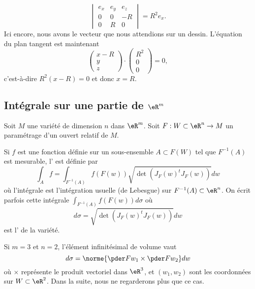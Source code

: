 \begin{example}
\begin{equation}
\begin{vmatrix}
			e_x & e_y & e_z \\
			0   & 0   & -R  \\
			0   & R   & 0
		\end{vmatrix}=R^2e_x.
	\end{equation}
	Ici encore, nous avons le vecteur que nous attendions sur un dessin. L'équation du plan tangent est maintenant
	\begin{equation}
		\begin{pmatrix}
			x-R \\
			y   \\
			z
		\end{pmatrix}\cdot
		\begin{pmatrix}
			R^2 \\
			0   \\
			0
		\end{pmatrix}=0,
	\end{equation}
	c'est-à-dire \( R^2(x-R)=0\) et donc \( x=R\).
\end{example}

\subsection{Intégrale sur une partie de \( \eR^m\)}

Soit \( M\) une variété de dimension \( n\) dans \( \eR^m\). Soit \( F : W \subset \eR^n \to M\) un paramétrage d'un ouvert relatif de \( M\).

Si \( f\) est une fonction définie sur un sous-ensemble \( A \subset F(W)\) tel que \( F^{-1}(A)\) est mesurable, l' est définie par
\begin{equation*}
	\int_A f = \int_{F^{-1}(A)} f(F(w)) \sqrt{\det(J_F(w)^t {J_F(w)})} dw
\end{equation*}
où l'intégrale est l'intégration usuelle (de Lebesgue) sur \( F^{-1}(A) \subset \eR^n\). On écrit parfois cette intégrale \( \int_{F^{-1}(A)} f(F(w)) d\sigma\) où
\begin{equation}        \label{EQooARMAooQPhQAL}
	d\sigma = \sqrt{\det(J_F(w)^t {J_F(w)})} dw
\end{equation}
est l' de la variété.

Si \( m = 3\) et \( n = 2\), l'élément infinitésimal de volume vaut
\begin{equation*}
	d \sigma = \norme{\pder F {w_1} \times \pder F {w_2}} dw
\end{equation*}
où \( \times\) représente le produit vectoriel dans \( \eR^3\), et \( (w_1,w_2)\) sont les coordonnées sur \( W \subset \eR^2\). Dans la suite, nous ne regarderons plus que ce cas.

